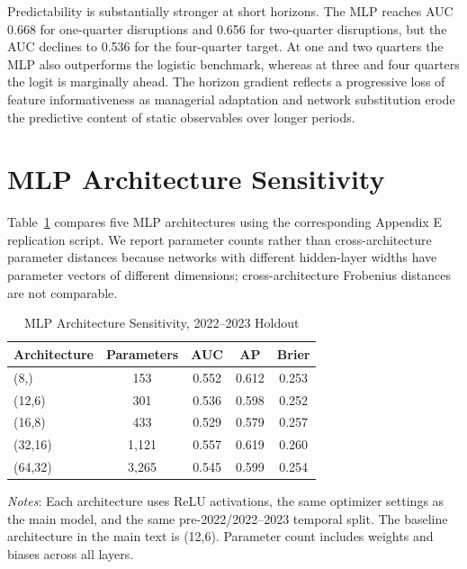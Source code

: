 \documentclass[12pt]{article}
\begin{document}
Predictability is substantially stronger at short horizons.  The MLP reaches
AUC 0.668 for one-quarter disruptions and 0.656 for two-quarter disruptions,
but the AUC declines to 0.536 for the four-quarter target.  At one and two
quarters the MLP also outperforms the logistic benchmark, whereas at three
and four quarters the logit is marginally ahead.  The horizon gradient
reflects a progressive loss of feature informativeness as managerial
adaptation and network substitution erode the predictive content of static
observables over longer periods.

\section{MLP Architecture Sensitivity}\label{app:architecture}

Table~\ref{tab:appendix_architecture} compares five MLP architectures using
the corresponding Appendix E replication script.  We report parameter counts
rather than cross-architecture parameter distances because networks with
different hidden-layer widths have parameter vectors of different dimensions;
cross-architecture Frobenius distances are not comparable.

\begin{table}[H]
\centering
\caption{MLP Architecture Sensitivity, 2022--2023 Holdout}\label{tab:appendix_architecture}
\begin{threeparttable}
\small
\begin{tabular}{lcccc}
\toprule
Architecture & Parameters & AUC & AP & Brier \\
\midrule
(8,)     & 153   & 0.552 & 0.612 & 0.253 \\
(12,6)   & 301   & 0.536 & 0.598 & 0.252 \\
(16,8)   & 433   & 0.529 & 0.579 & 0.257 \\
(32,16)  & 1,121 & 0.557 & 0.619 & 0.260 \\
(64,32)  & 3,265 & 0.545 & 0.599 & 0.254 \\
\bottomrule
\end{tabular}
\begin{tablenotes}
  \small
  \item \textit{Notes}: Each architecture uses ReLU activations, the same
  optimizer settings as the main model, and the same pre-2022/2022--2023
  temporal split.  The baseline architecture in the main text is (12,6).
  Parameter count includes weights and biases across all layers.
\end{tablenotes}
\end{threeparttable}
\end{table}
\end{document}
